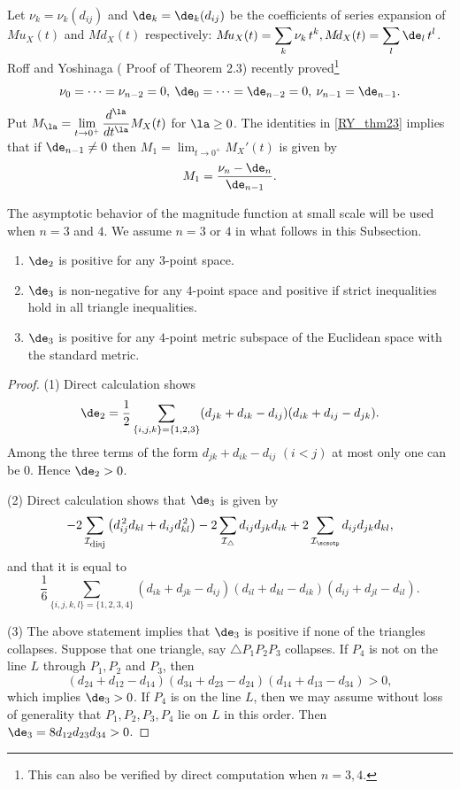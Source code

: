 Let $\nu_k=\nu_k(d_{ij})$ and $\de_k=\de_k(d_{ij})$ be the coefficients of series expansion of $M\!u_X(t)$ and $M\!d_X(t)$ respectively: $\displaystyle M\!u_X(t)=\sum_k\nu_k\,t^k, M\!d_X(t)=\sum_l\de_l\,t^l$. 
Roff and Yoshinaga (\cite{RY} Proof of Theorem 2.3) recently proved\footnote{This can also be verified by direct computation when $n=3,4$.} 
\begin{equation}\label{RY_thm23}
\nu_0=\dots =\nu_{n-2}=0,\> \de_0=\dots =\de_{n-2}=0,\> \nu_{n-1}=\de_{n-1}.
\end{equation}
%
Put $\displaystyle M_\la=\lim_{t\to 0^+}\frac{d^\la}{dt^\la}M_X(t)$ for $\la\ge0$. 
The identities in \eqref{RY_thm23} implies that if $\de_{n-1}\ne0$ then $\displaystyle M_1=\lim_{t\to0^+}M_X'(t)$  is given by 
\begin{equation}\label{M1}
M_1=\frac{\nu_n-\de_n}{\de_{n-1}}.
\end{equation}
%
%
%

The asymptotic behavior of the magnitude function at small scale will be used when $n=3$ and $4$. 
We assume $n=3$ or $4$ in what follows in this Subsection. 
%
\begin{proposition}\label{pos_Mpd}
\begin{enumerate}
\item $\de_2$ is positive for any $3$-point space. 
\item $\de_3$ is non-negative for any $4$-point space and positive if strict inequalities hold in all triangle inequalities. 
\item $\de_3$ is positive for any $4$-point metric subspace of the Euclidean space with the standard metric. 
\end{enumerate}
\end{proposition}

\begin{proof} 
(1) Direct calculation shows 
\begin{equation}\label{cd2}
\de_2=\frac12\sum_{\{i,j,k\}=\{1,2,3\}}(d_{jk}+d_{ik}-d_{ij})(d_{ik}+d_{ij}-d_{jk}).
\end{equation}
%
Among the three terms of the form $d_{jk}+d_{ik}-d_{ij}$ $(i<j)$ at most only one can be $0$. Hence $\de_2>0$. 

\smallskip
(2) Direct calculation shows that $\de_3$ is given by 
\[
-2\sum_{\mathcal{I}_{\mbox{\rm \scriptsize disj}}}\left(d_{ij}^{\,2}d_{kl}+d_{ij}d_{kl}^{\,2}\right)-2\sum_{\mathcal{I}_\triangle}d_{ij}d_{jk}d_{ik}+2\sum_{\mathcal{I}_\scsotp}d_{ij}d_{jk}d_{kl},
\]
and that it is equal to 
\begin{equation}\label{cd3}
\frac16\sum_{\{i,j,k,l\}=\{1,2,3,4\}}(d_{ik}+d_{jk}-d_{ij})(d_{il}+d_{kl}-d_{ik})(d_{ij}+d_{jl}-d_{il}). 
\end{equation}

(3) The above statement implies that $\de_3$ is positive if none of the triangles collapses. 
Suppose that one triangle, say $\triangle P_1P_2P_3$ collapses. 
If $P_4$ is not on the line $L$ through $P_1, P_2$ and $P_3$, then 
\[(d_{24}+d_{12}-d_{14})(d_{34}+d_{23}-d_{24})(d_{14}+d_{13}-d_{34})>0,\]
which implies $\de_3>0$. 
If $P_4$ is on the line $L$, then we may assume without loss of generality that $P_1, P_2, P_3, P_4$ lie on $L$ in this order. Then $\de_3=8d_{12}d_{23}d_{34}>0$. 
\end{proof}
